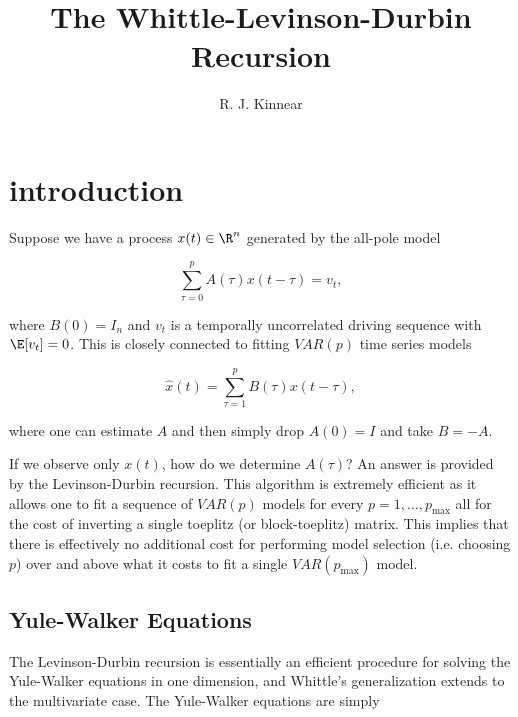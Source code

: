 \documentclass[12pt]{article}
\title{The Whittle-Levinson-Durbin Recursion}
\author{R. J. Kinnear}
\begin{document}
\maketitle


\tableofcontents
\listoftodos

\section{introduction}
Suppose we have a process $x(t) \in \R^n$ generated by the all-pole model

\begin{equation}
  \sum_{\tau = 0}^p A(\tau)x(t - \tau) = v_t,
\end{equation}

where $B(0) = I_n$ and $v_t$ is a temporally uncorrelated driving
sequence with $\E[v_t] = 0$.  This is closely connected to fitting
$VAR(p)$ time series models

\begin{equation}
  \label{eqn:var}
  \widehat{x}(t) = \sum_{\tau = 1}^p B(\tau)x(t - \tau),
\end{equation}

where one can estimate $A$ and then simply drop $A(0) = I$ and take $B = -A$.

If we observe only $x(t)$, how do we determine $A(\tau)$?  An answer
is provided by the Levinson-Durbin recursion.  This algorithm is
extremely efficient as it allows one to fit a sequence of $VAR(p)$
models for every $p = 1, \ldots, p_{\text{max}}$ all for the cost of
inverting a single toeplitz (or block-toeplitz) matrix.  This implies
that there is effectively no additional cost for performing model
selection (i.e. choosing $p$) over and above what it costs to fit a
single $VAR(p_{\text{max}})$ model.

\subsection{Yule-Walker Equations}
The Levinson-Durbin recursion is essentially an efficient procedure
for solving the Yule-Walker equations in one dimension, and Whittle's
generalization extends to the multivariate case.  The Yule-Walker
equations are simply
\end{document}
